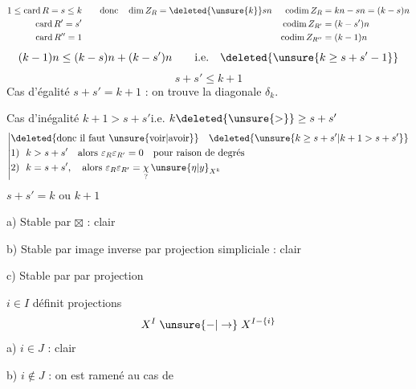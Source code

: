\[
\begin{aligned}
 1\leq\operatorname{card}R=s\leq k&\qquad\text{donc}\quad\dim Z_R=\deleted{\unsure{k}}sn
   &\operatorname{codim} Z_R&=kn-sn=(k-s)n\\
 \operatorname{card}R'=s'&&\operatorname{codim} Z_{R'}&=(k-s')n\\
 \operatorname{card}R''=1&&\operatorname{codim} Z_{R''}&=(k-1)n
\end{aligned}
\]
\[
 (k-1)n\leq(k-s)n+(k-s')n\qquad\text{i.e.}\quad\deleted{\unsure{k\geq s+s'-1}}
\]
\[
 \boxed{s+s'\leq k+1}
\]
Cas d'égalité \quad \uline{$s+s'=k+1$} : on trouve la diagonale $\delta_k$.

Cas d'inégalité \qquad $k+1>s+s'$\quad i.e. $k\deleted{\unsure{>}}\geq s+s'$
\[
 \left|\begin{aligned}
 &\deleted{\text{donc il faut }\text{\unsure{voir|avoir}}}\quad\deleted{\unsure{k\geq s+s'|k+1>s+s'}}\\
 &\text{1) }\ k>s+s'\quad\text{alors }\varepsilon_R\varepsilon_{R'}=0\quad\text{pour raison de degrés}\\
 &\text{2) }\ k=s+s',\quad\text{alors }\varepsilon_R\varepsilon_{R'}=\underset{?}{\chi}\,\unsure{\eta|y}_{X^k}
 \end{aligned}\right.
\]
$s+s'=k$ ou $k+1$

a) Stable par $\boxtimes$ : clair

b) Stable par image inverse par projection
simpliciale : clair 

c) Stable par  \uline{} par projection

$i\in I$ définit  projections
\[
 X^I\mathrel{\unsure{-|\to}} X^{I-\{i\}}
\]
a) $i\in J$ : clair

b) $i\notin J$ : on est ramené au cas de


